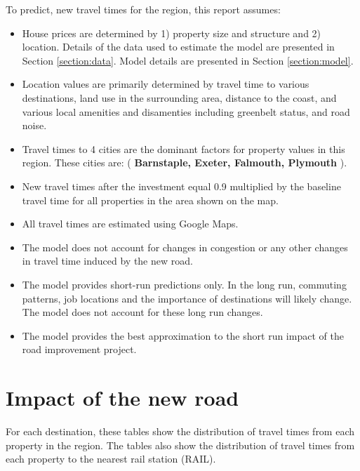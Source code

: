 \documentclass{article}\usepackage[]{graphicx}\usepackage[]{color}
\begin{document}
To predict, new travel times for the region, this report assumes:
\begin{itemize}
\item House prices are determined by 1) property size and structure and 2) location. Details of the data used to estimate the model are presented in Section \ref{section:data}. Model details are presented in Section \ref{section:model}.
\item Location values are primarily determined by travel time to various destinations, land use in the surrounding area, distance to the coast, and various local amenities and disamenties including greenbelt status, and road noise.  
\item Travel times to 4 cities are the dominant factors for property values in this region. These cities are: (\textbf{ Barnstaple, Exeter, Falmouth, Plymouth} ).
\item New travel times after the investment equal 0.9 multiplied by the baseline travel time 
for all properties in the area shown on the map. 
\item All travel times are estimated using Google Maps.
\item The model does not account for changes in congestion or any other changes in travel time induced by the new road.
\item The model provides short-run predictions only. In the long run, commuting patterns, job locations and the importance of destinations will likely change. The model does not account for these long run changes.
\item The model provides the best approximation to the short run impact of the road improvement
project.
\end{itemize}

\section{Impact of the new road}

For each destination, these tables show the distribution of travel times from each property in the region. The tables also show the distribution of travel times from each property to the nearest rail station (RAIL).
\end{document}
